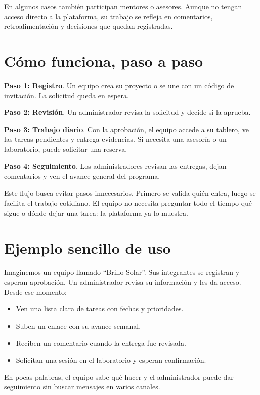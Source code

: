 \documentclass[12pt]{article}
\begin{document}
En algunos casos también participan mentores o asesores. Aunque no tengan acceso directo a la plataforma, su trabajo se refleja en comentarios, retroalimentación y decisiones que quedan registradas.

\section{Cómo funciona, paso a paso}
\textbf{Paso 1: Registro}. Un equipo crea su proyecto o se une con un código de invitación. La solicitud queda en espera.

\textbf{Paso 2: Revisión}. Un administrador revisa la solicitud y decide si la aprueba.

\textbf{Paso 3: Trabajo diario}. Con la aprobación, el equipo accede a su tablero, ve las tareas pendientes y entrega evidencias. Si necesita una asesoría o un laboratorio, puede solicitar una reserva.

\textbf{Paso 4: Seguimiento}. Los administradores revisan las entregas, dejan comentarios y ven el avance general del programa.

Este flujo busca evitar pasos innecesarios. Primero se valida quién entra, luego se facilita el trabajo cotidiano. El equipo no necesita preguntar todo el tiempo qué sigue o dónde dejar una tarea: la plataforma ya lo muestra.

\section{Ejemplo sencillo de uso}
Imaginemos un equipo llamado ``Brillo Solar''. Sus integrantes se registran y esperan aprobación. Un administrador revisa su información y les da acceso. Desde ese momento:
\begin{itemize}
  \item Ven una lista clara de tareas con fechas y prioridades.
  \item Suben un enlace con su avance semanal.
  \item Reciben un comentario cuando la entrega fue revisada.
  \item Solicitan una sesión en el laboratorio y esperan confirmación.
\end{itemize}

En pocas palabras, el equipo sabe qué hacer y el administrador puede dar seguimiento sin buscar mensajes en varios canales.
\end{document}

